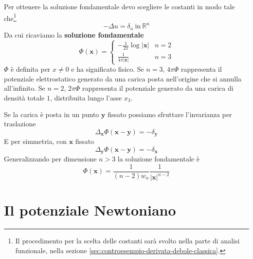 \documentclass[10pt,a4paper,twoside,openright]{book}
\newcommand{\x}{\mathbf{x}}
\newcommand{\y}{\mathbf{y}}
\begin{document}
Per ottenere la soluzione fondamentale devo scegliere le costanti in modo tale che\footnote{Il procedimento per la scelta delle costanti sarà svolto nella parte di analisi funzionale, nella sezione \ref{sec:controesempio-derivata-debole-classica}.}
\begin{equation*}
    -\Delta u=\delta _{n} \ \text{in} \ \mathbb{R}^{n}
\end{equation*}
Da cui ricaviamo la \textbf{soluzione fondamentale}
\begin{equation}
    \boxed{\Phi (\x) =
        \begin{cases}
            -\frac{1}{2\pi }\log|\x| & n=2 \\
            \frac{1}{4\pi |\x| }     & n=3
        \end{cases}}
\end{equation}
$\displaystyle \Phi $ è definita per $\displaystyle x\neq 0$ e ha significato fisico. Se $n=3$, $\displaystyle 4\pi \Phi $ rappresenta il potenziale elettrostatico generato da una carica posta nell'origine che si annulla all'infinito. Se $n=2$, $\displaystyle 2\pi \Phi $ rappresenta il potenziale generato da una carica di densità totale $1$, distribuita lungo l'asse $\displaystyle x_{3}$.

Se la carica è posta in un punto $\y$ fissato possiamo sfruttare l'invarianza per traslazione
\begin{equation*}
    \Delta _{\x} \Phi (\x-\y) =-\delta _{\y}
\end{equation*}
E per simmetria, con $\x$ fissato
\begin{equation*}
    \Delta _{\y} \Phi (\x-\y) =-\delta _{\x}
\end{equation*}
Generalizzando per dimensione $n >3$ la soluzione fondamentale è
\begin{equation*}
    \Phi (\x) =\frac{1}{(n-2) w_{n}}\frac{1}{|\x| ^{n-2}}
\end{equation*}
\section{Il potenziale Newtoniano}
\end{document}
